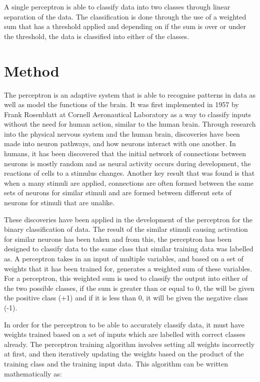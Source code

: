 \documentclass[10pt,twocolumn,a4paper]{article}
\begin{document}
A single perceptron is able to classify data into two classes through linear
separation of the data. The classification is done through the use of a
weighted sum that has a threshold applied and depending on if the sum is
over or under the threshold, the data is classified into either of the classes.

\section{Method}

The perceptron is an adaptive system that is able to recognise patterns in data as well as model the functions of the brain. It was first implemented in 1957 by Frank Rosenblatt at Cornell Aeronautical Laboratory as a way to classify inputs without the need for human action, similar to the human brain. Through research into the physical nervous system and the human brain, discoveries have been made into neuron pathways, and how neurons interact with one another. In humans, it has been discovered that the initial network of connections between neurons is mostly random and as neural activity occurs during development, the reactions of cells to a stimulus changes. Another key result that was found is that when a many stimuli are applied, connections are often formed between the same sets of neurons for similar stimuli and are formed between different sets of neurons for stimuli that are unalike. 

These discoveries have been applied in the development of the perceptron for the binary classification of data. The result of the similar stimuli causing activation for similar neurons has been taken and from this, the perceptron has been designed to classify data to the same class that similar training data was labelled as. A perceptron takes in an input of multiple variables, and based on a set of weights that it has been trained for, generates a weighted sum of these variables. For a perceptron, this weighted sum is used to classify the output into either of the two possible classes, if the sum is greater than or equal to 0, the will be given the positive class (+1) and if it is less than 0, it will be given the negative class (-1).

In order for the perceptron to be able to accurately classify data, it must have weights trained based on a set of inputs which are labelled with correct classes already. The perceptron training algorithm involves setting all weights incorrectly at first, and then iteratively updating the weights based on the product of the training class and the training input data. This algorithm can be written mathematically as:
\end{document}
